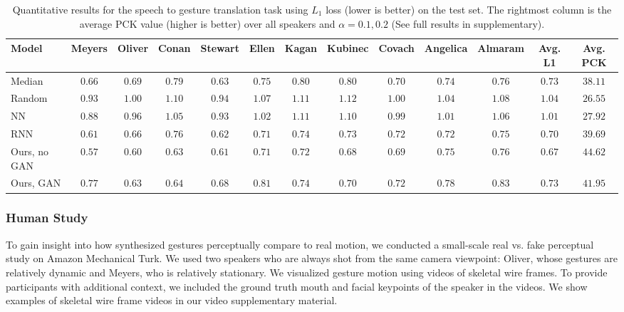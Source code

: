 \documentclass[10pt,twocolumn,letterpaper]{article}
\begin{document}
\begin{table*}
\small
\begin{center}
\setlength{\tabcolsep}{3pt}
\begin{tabular}{lcccccccccccc}
\toprule
Model & Meyers & Oliver & Conan & Stewart & Ellen & Kagan & Kubinec & Covach & Angelica & Almaram & \textbf{Avg. L1} & \textbf{Avg. PCK}  \tabularnewline
\midrule
Median                     & $0.66$ & $0.69$ & $0.79$ & $0.63$ & $0.75$ & $0.80$ & $0.80$ & $0.70$ & $0.74$ & $0.76$ & $0.73$ & $38.11$ \tabularnewline
Random                     & $0.93$ & $1.00$ & $1.10$ & $0.94$ & $1.07$ & $1.11$ & $1.12$ & $1.00$ & $1.04$ & $1.08$  & $1.04$ & $26.55$ \tabularnewline
NN~\cite{vggish}           & $0.88$ & $0.96$ & $1.05$ & $0.93$ & $1.02$ & $1.11$ & $1.10$ & $0.99$ & $1.01$ & $1.06$ & $1.01$ & $27.92$ \tabularnewline
\midrule
RNN~\cite{shlizermanaudio} & $0.61$ & $0.66$ & $0.76$ & $0.62$ & $\mathbf{0.71}$ & $0.74$ & $0.73$ & $0.72$ & $\mathbf{0.72}$ & $\mathbf{0.75}$  & $0.70$ & $39.69$ \tabularnewline
\midrule
Ours, no GAN               & $\mathbf{0.57}$ & $\mathbf{0.60}$ & $\mathbf{0.63}$ & $\mathbf{0.61}$ & $\mathbf{0.71}$ & $\mathbf{0.72}$ & $\mathbf{0.68}$ & $\mathbf{0.69}$ & $0.75$ & $0.76$   & $\mathbf{0.67}$ & $\mathbf{44.62}$ \tabularnewline
Ours, GAN                  & $0.77$ & $0.63$ & $0.64$ & $0.68$ & $0.81$ & $0.74$ & $0.70$ & $0.72$ & $0.78$ & $0.83$ & $0.73$ & $41.95$ \tabularnewline
\bottomrule
\end{tabular}
\end{center}
\vspace{-4mm}
\caption{Quantitative results for the speech to gesture translation task using $L_1$ loss (lower is better) on the test set. The rightmost column is the average PCK value (higher is better) over all speakers and $\alpha=0.1,0.2$ (See full results in supplementary).}
\label{tab-L1}
\end{table*}

\subsubsection{Human Study}
To gain insight into how synthesized gestures perceptually compare to real motion, we conducted a small-scale real vs. fake perceptual study on Amazon Mechanical Turk. We used two speakers who are always shot from the same camera viewpoint: Oliver, whose gestures are relatively dynamic and Meyers, who is relatively stationary.
We visualized gesture motion using videos of skeletal wire frames. To provide participants with additional context, we included the ground truth mouth and facial keypoints of the speaker in the videos. We show examples of skeletal wire frame videos in our video supplementary material.
\end{document}
